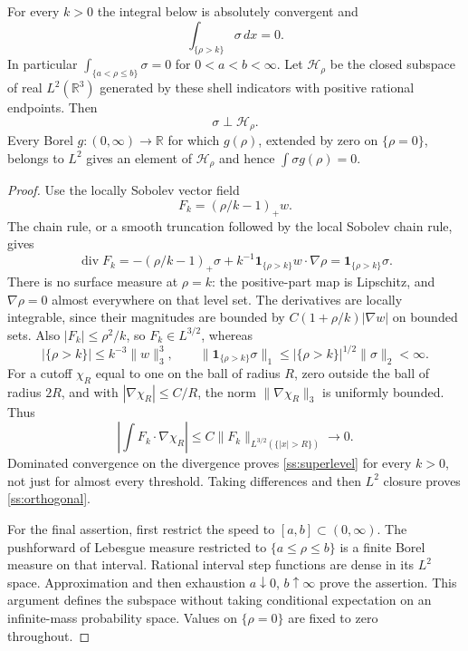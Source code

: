 \begin{theorem}\label{ss:shell}
For every $k>0$ the integral below is absolutely convergent and
\begin{equation}\label{ss:superlevel}
 \int_{\{\rho>k\}}\sigma\,dx=0.
\end{equation}
In particular $\int_{\{a<\rho\le b\}}\sigma=0$ for $0<a<b<\infty$.
Let $\mathcal H_\rho$ be the closed subspace of real $L^2(\mathbb R^3)$
generated by these shell indicators with positive rational endpoints.
Then
\begin{equation}\label{ss:orthogonal}
 \sigma\perp\mathcal H_\rho.
\end{equation}
Every Borel $g:(0,\infty)\to\mathbb R$ for which $g(\rho)$, extended
by zero on $\{\rho=0\}$, belongs to $L^2$ gives an element of
$\mathcal H_\rho$ and hence $\int\sigma g(\rho)=0$.
\end{theorem}
\begin{proof}
Use the locally Sobolev vector field
\[
 F_k=(\rho/k-1)_+w.
\]
The chain rule, or a smooth truncation followed by the local Sobolev
chain rule, gives
\[
 \operatorname{div}F_k
 =-(\rho/k-1)_+\sigma+
   k^{-1}\mathbf1_{\{\rho>k\}}w\cdot\nabla\rho
 =\mathbf1_{\{\rho>k\}}\sigma.
\]
There is no surface measure at $\rho=k$: the positive-part map is
Lipschitz, and $\nabla\rho=0$ almost everywhere on that level set.
The derivatives are locally integrable, since their magnitudes are
bounded by $C(1+\rho/k)|\nabla w|$ on bounded sets.
Also $|F_k|\le\rho^2/k$, so $F_k\in L^{3/2}$, whereas
\[
 |\{\rho>k\}|\le k^{-3}\|w\|_3^3,\qquad
 \|\mathbf1_{\{\rho>k\}}\sigma\|_1
 \le |\{\rho>k\}|^{1/2}\|\sigma\|_2<\infty.
\]
For a cutoff $\chi_R$ equal to one on the ball of radius $R$, zero
outside the ball of radius $2R$, and with $|\nabla\chi_R|\le C/R$,
the norm $\|\nabla\chi_R\|_3$ is uniformly bounded. Thus
\[
 \left|\int F_k\cdot\nabla\chi_R\right|
 \le C\|F_k\|_{L^{3/2}(\{|x|>R\})}\longrightarrow0.
\]
Dominated convergence on the divergence proves \eqref{ss:superlevel}
for every $k>0$, not just for almost every threshold. Taking differences
and then $L^2$ closure proves \eqref{ss:orthogonal}.

For the final assertion, first restrict the speed to $[a,b]\subset
(0,\infty)$. The pushforward of Lebesgue measure restricted to
$\{a\le\rho\le b\}$ is a finite Borel measure on that interval.
Rational interval step functions are dense in its $L^2$ space.
Approximation and then exhaustion $a\downarrow0$, $b\uparrow\infty$
prove the assertion. This argument defines the subspace without taking
conditional expectation on an infinite-mass probability space. Values on
$\{\rho=0\}$ are fixed to zero throughout.
\end{proof}

